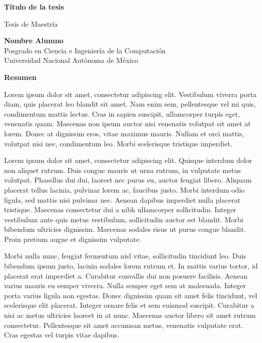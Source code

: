 
\begin{center}
\large{\bf Título de la tesis}

\normalsize{Tesis de Maestría}\\
\vspace{0.5cm}

\normalsize{\bf Nombre Alumno}\\
Posgrado en Ciencia e Ingeniería de la Computación\\
Universidad Nacional Autónoma de México

\vspace{1.0cm}

\large{\textbf{Resumen\\}}

\end{center}
Lorem ipsum dolor sit amet, consectetur adipiscing elit. Vestibulum viverra porta diam, quis placerat leo blandit sit amet. Nam enim sem, pellentesque vel mi quis, condimentum mattis lectus. Cras in sapien suscipit, ullamcorper turpis eget, venenatis quam. Maecenas non ipsum auctor nisi venenatis volutpat sit amet at lorem. Donec at dignissim eros, vitae maximus mauris. Nullam et orci mattis, volutpat nisi nec, condimentum leo. Morbi scelerisque tristique imperdiet.

Lorem ipsum dolor sit amet, consectetur adipiscing elit. Quisque interdum dolor non aliquet rutrum. Duis congue mauris ut urna rutrum, in vulputate metus volutpat. Phasellus dui dui, laoreet nec purus eu, auctor feugiat libero. Aliquam placerat tellus lacinia, pulvinar lorem ac, faucibus justo. Morbi interdum odio ligula, sed mattis nisi pulvinar nec. Aenean dapibus imperdiet nulla placerat tristique. Maecenas consectetur dui a nibh ullamcorper sollicitudin. Integer vestibulum ante quis metus vestibulum, sollicitudin auctor est blandit. Morbi bibendum ultricies dignissim. Maecenas sodales risus ut purus congue blandit. Proin pretium augue et dignissim vulputate.

Morbi nulla nunc, feugiat fermentum nisl vitae, sollicitudin tincidunt leo. Duis bibendum ipsum justo, lacinia sodales lorem rutrum et. In mattis varius tortor, id placerat erat imperdiet a. Curabitur convallis dui non posuere facilisis. Aenean varius mauris eu semper viverra. Nulla semper eget sem at malesuada. Integer porta varius ligula non egestas. Donec dignissim quam sit amet felis tincidunt, vel scelerisque elit placerat. Integer ornare felis et sem euismod suscipit. Curabitur a nisi ac metus ultricies laoreet in at nunc. Maecenas auctor libero sit amet rutrum consectetur. Pellentesque sit amet accumsan metus, venenatis vulputate erat. Cras egestas vel turpis vitae dapibus.
 
